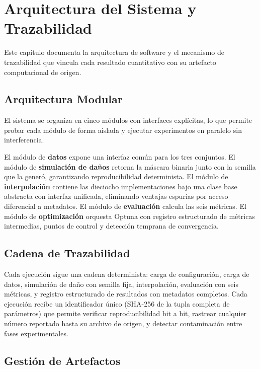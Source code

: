 \chapter{Arquitectura del Sistema y Trazabilidad}
\label{ch:arquitectura}

Este capítulo documenta la arquitectura de software y el mecanismo de trazabilidad que vincula cada resultado cuantitativo con su artefacto computacional de origen.

\section{Arquitectura Modular}

El sistema se organiza en cinco módulos con interfaces explícitas, lo que permite probar cada módulo de forma aislada y ejecutar experimentos en paralelo sin interferencia.

El módulo de \textbf{datos} expone una interfaz común para los tres conjuntos. El módulo de \textbf{simulación de daños} retorna la máscara binaria junto con la semilla que la generó, garantizando reproducibilidad determinista. El módulo de \textbf{interpolación} contiene las dieciocho implementaciones bajo una clase base abstracta con interfaz unificada, eliminando ventajas espurias por acceso diferencial a metadatos. El módulo de \textbf{evaluación} calcula las seis métricas. El módulo de \textbf{optimización} orquesta Optuna con registro estructurado de métricas intermedias, puntos de control y detección temprana de convergencia.

\section{Cadena de Trazabilidad}

Cada ejecución sigue una cadena determinista: carga de configuración, carga de datos, simulación de daño con semilla fija, interpolación, evaluación con seis métricas, y registro estructurado de resultados con metadatos completos. Cada ejecución recibe un identificador único (SHA-256 de la tupla completa de parámetros) que permite verificar reproducibilidad bit a bit, rastrear cualquier número reportado hasta su archivo de origen, y detectar contaminación entre fases experimentales.

\section{Gestión de Artefactos}

